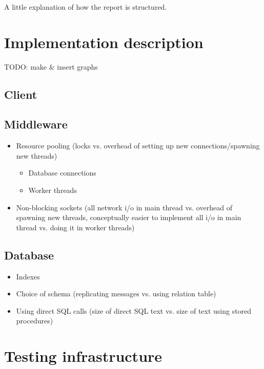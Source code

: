 \documentclass{article}
\begin{document}
    \maketitle

    A little explanation of how the report is structured.

    \section{Implementation description}
        TODO: make \& insert graphs

        \subsection{Client}
        \subsection{Middleware}
            \begin{itemize}
                \item Resource pooling (locks vs. overhead of setting up new connections/spawning new threads)
                \begin{itemize}
                    \item Database connections
                    \item Worker threads
                \end{itemize}
                \item Non-blocking sockets (all network i/o in main thread vs. overhead of spawning new threads, conceptually easier to implement all i/o in main thread vs. doing it in worker threads)
            \end{itemize}
        \subsection{Database}
            \begin{itemize}
                \item Indexes
                \item Choice of schema (replicating messages vs. using relation table)
                \item Using direct SQL calls (size of direct SQL text vs. size of text using stored procedures)
            \end{itemize}

    \section{Testing infrastructure}
\end{document}
